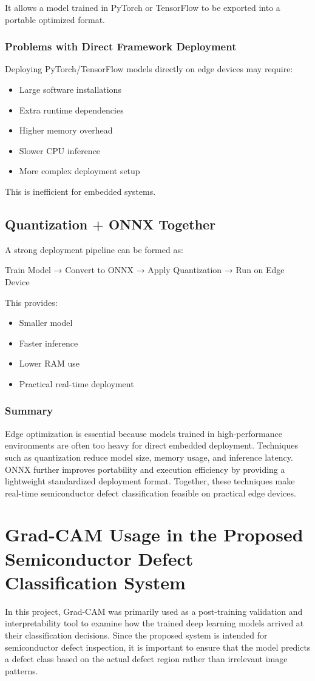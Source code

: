 It allows a model trained in PyTorch or TensorFlow to be exported into a portable optimized format.

\subsubsection{Problems with Direct Framework Deployment}
Deploying PyTorch/TensorFlow models directly on edge devices may require:
\begin{itemize}
\item Large software installations
\item Extra runtime dependencies
\item Higher memory overhead
\item Slower CPU inference
\item More complex deployment setup
\end{itemize}
This is inefficient for embedded systems.

\subsection{Quantization + ONNX Together}
A strong deployment pipeline can be formed as:

Train Model → Convert to ONNX → Apply Quantization → Run on Edge Device

This provides:
\begin{itemize}
\item Smaller model
\item Faster inference
\item Lower RAM use
\item Practical real-time deployment
\end{itemize}

\subsubsection{Summary}
Edge optimization is essential because models trained in high-performance environments are often too heavy for direct embedded deployment. Techniques such as quantization reduce model size, memory usage, and inference latency. ONNX further improves portability and execution efficiency by providing a lightweight standardized deployment format. Together, these techniques make real-time semiconductor defect classification feasible on practical edge devices.


\section{Grad-CAM Usage in the Proposed Semiconductor Defect Classification System}
In this project, Grad-CAM was primarily used as a post-training validation and interpretability tool to examine how the trained deep learning models arrived at their classification decisions. Since the proposed system is intended for semiconductor defect inspection, it is important to ensure that the model predicts a defect class based on the actual defect region rather than irrelevant image patterns.

